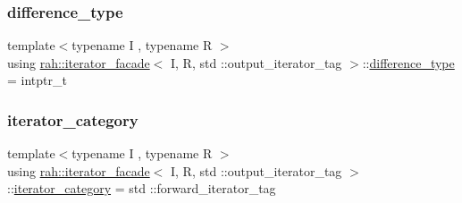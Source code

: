 \subsubsection{\texorpdfstring{difference\_type}{difference\_type}}
{\footnotesize\ttfamily template$<$typename I , typename R $>$ \\
using \mbox{\hyperlink{structrah_1_1iterator__facade}{rah\+::iterator\+\_\+facade}}$<$ I, R, std \+::output\+\_\+iterator\+\_\+tag $>$\+::\mbox{\hyperlink{structrah_1_1iterator__facade_3_01_i_00_01_r_00_01std_01_1_1output__iterator__tag_01_4_a3564661cd457ec25b43c0f7a831d1224}{difference\+\_\+type}} =  intptr\+\_\+t}

\mbox{\label{structrah_1_1iterator__facade_3_01_i_00_01_r_00_01std_01_1_1output__iterator__tag_01_4_a465bbb8a7a2ae321b8183e3c9e727423}} 
\subsubsection{\texorpdfstring{iterator\_category}{iterator\_category}}
{\footnotesize\ttfamily template$<$typename I , typename R $>$ \\
using \mbox{\hyperlink{structrah_1_1iterator__facade}{rah\+::iterator\+\_\+facade}}$<$ I, R, std \+::output\+\_\+iterator\+\_\+tag $>$\+::\mbox{\hyperlink{structrah_1_1iterator__facade_3_01_i_00_01_r_00_01std_01_1_1output__iterator__tag_01_4_a465bbb8a7a2ae321b8183e3c9e727423}{iterator\+\_\+category}} =  std \+::forward\+\_\+iterator\+\_\+tag}

\mbox{\label{structrah_1_1iterator__facade_3_01_i_00_01_r_00_01std_01_1_1output__iterator__tag_01_4_aaa99676a12d594e70c36d9c6fc3deb52}} 
